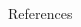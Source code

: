 \documentclass[final,hyperref={pdfpagelabels=false}]{beamer}
\begin{document}
\begin{frame}[t]
\begin{columns}[t]
\begin{column}{.48\textwidth}
\begin{block}{References}
{\begin{thebibliography}{}
\end{thebibliography}

}

\end{block}





\end{column} %

\begin{column}{.008\textwidth}\end{column} %

\end{columns} %

\end{frame} %
\end{document}
